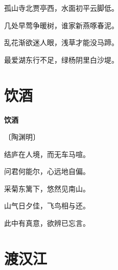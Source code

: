 \documentclass[12pt,UTF-8,openany,fontset=none]{ctexbook}
\begin{document}
    \vspace{18pt}  %

\begin{center}
    \begin{Large}

        孤山寺北贾亭西，水面初平云脚低。

        几处早莺争暖树，谁家新燕啄春泥。

        乱花渐欲迷人眼，浅草才能没马蹄。

        最爱湖东行不足，绿杨阴里白沙堤。

    \end{Large}

\end{center}

\vspace{8pt}
\clearpage

\section{饮酒}


\begin{center}
    {\bfseries 饮酒}

    \vspace{18pt}

    \begin{large}\xuwen
        〔陶渊明〕
    \end{large}

\end{center}

    \vspace{18pt}  %

\begin{center}
    \begin{Large}

        结庐在人境，而无车马喧。

        问君何能尔，心远地自偏。

        采菊东篱下，悠然见南山。

        山气日夕佳，飞鸟相与还。

        此中有真意，欲辨已忘言。

    \end{Large}

\end{center}

\vspace{8pt}
\clearpage

\section{渡汉江}
\end{document}
